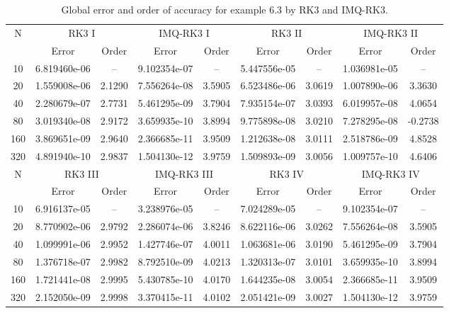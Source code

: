 \documentclass[a4paper, preprint,11pt]{elsarticle}
\numberwithin{equation}{section}
\begin{document}
\begin{table}[h]
    \centering
    \caption{Global error and order of accuracy for example 6.3 by RK3 and IMQ-RK3.}
    \begin{tabular}{c c c c c c c c c}
        \toprule
        N & \multicolumn{2}{c}{RK3 I} & \multicolumn{2}{c}{IMQ-RK3 I} & \multicolumn{2}{c}{RK3 II} & \multicolumn{2}{c}{IMQ-RK3 II}\\
        \cmidrule(lr){2-3} \cmidrule(lr){4-5} \cmidrule(lr){6-7} \cmidrule(lr){8-9}
          & Error & Order & Error & Order & Error & Order & Error & Order\\
        \midrule
        10 & 6.819460e-06 & --& 9.102354e-07 &-- & 5.447556e-05 &-- &1.036981e-05  &-- \\
        20 &  1.559008e-06  & 2.1290 &7.556264e-08  &3.5905 & 6.523486e-06  & 3.0619 & 1.007890e-06 & 3.3630 \\
        40  & 2.280679e-07 & 2.7731 & 5.461295e-09   & 3.7904&7.935154e-07 & 3.0393 &  6.019957e-08  &  4.0654 \\
        80  & 3.019340e-08 &  2.9172 &3.659935e-10  &3.8994  &9.775898e-08 & 3.0210 & 7.278295e-08   &  -0.2738\\
        160 &  3.869651e-09 & 2.9640 &  2.366685e-11 & 3.9509 &1.212638e-08  &  3.0111 & 2.518786e-09 & 4.8528 \\
        320 & 4.891940e-10 & 2.9837 & 1.504130e-12 & 3.9759 &1.509893e-09 &3.0056 & 1.009757e-10 & 4.6406\\
       \midrule
        N & \multicolumn{2}{c}{RK3 III} & \multicolumn{2}{c}{IMQ-RK3 III} & \multicolumn{2}{c}{RK3 IV} & \multicolumn{2}{c}{IMQ-RK3 IV}\\
        \cmidrule(lr){2-3} \cmidrule(lr){4-5} \cmidrule(lr){6-7} \cmidrule(lr){8-9}
          & Error & Order & Error & Order & Error & Order  & Error & Order \\
        \midrule  
 10 & 6.916137e-05& --&3.238976e-05 &-- & 7.024289e-05  &-- & 9.102354e-07   &-- \\
        20 & 8.770902e-06 & 2.9792& 2.286074e-06 & 3.8246&8.622116e-06 & 3.0262&   7.556264e-08   & 3.5905\\
        40  & 1.099991e-06 & 2.9952&1.427746e-07 &4.0011 &1.063681e-06   &3.0190 &  5.461295e-09 & 3.7904   \\
        80  & 1.376718e-07 & 2.9982&8.792510e-09 &  4.0213 & 1.320313e-07   &3.0101 &  3.659935e-10& 3.8994 \\
        160 & 1.721441e-08 &2.9995 &5.430785e-10   &  4.0170 &1.644235e-08   &3.0054 & 2.366685e-11 & 3.9509 \\
        320 &  2.152050e-09 &2.9998 &3.370415e-11   &4.0102  & 2.051421e-09& 3.0027 &  1.504130e-12   &3.9759 \\
\bottomrule
    \end{tabular}
\end{table}
\end{document}
